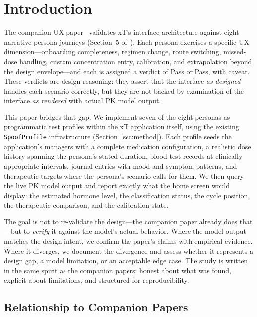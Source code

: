 \documentclass[11pt,a4paper]{article}
\newcommand{\good}[1]{\textcolor{ok}{#1}}
\newcommand{\code}[1]{\texttt{\small #1}}
\begin{document}
\tableofcontents
\clearpage

\section{Introduction}
\label{sec:intro}

The companion UX paper~\cite{xtux} validates xT's interface architecture
against eight narrative persona journeys (Section~5 of~\cite{xtux}). Each
persona exercises a specific UX dimension---onboarding completeness, regimen
change, route switching, missed-dose handling, custom concentration entry,
calibration, and extrapolation beyond the design envelope---and each is
assigned a verdict of \good{Pass} or \good{Pass, with caveat.} These
verdicts are design reasoning: they assert that the interface \emph{as
designed} handles each scenario correctly, but they are not backed by
examination of the interface \emph{as rendered} with actual PK model output.

This paper bridges that gap. We implement seven of the eight personas as
programmatic test profiles within the xT application itself, using the
existing \code{SpoofProfile} infrastructure (Section~\ref{sec:method}).
Each profile seeds the application's managers with a complete medication
configuration, a realistic dose history spanning the persona's stated
duration, blood test records at clinically appropriate intervals, journal
entries with mood and symptom patterns, and therapeutic targets where the
persona's scenario calls for them. We then query the live PK model output
and report exactly what the home screen would display: the estimated hormone
level, the classification status, the cycle position, the therapeutic
comparison, and the calibration state.

The goal is not to re-validate the design---the companion paper already does
that---but to \emph{verify} it against the model's actual behavior. Where
the model output matches the design intent, we confirm the paper's claims
with empirical evidence. Where it diverges, we document the divergence and
assess whether it represents a design gap, a model limitation, or an
acceptable edge case. The study is written in the same spirit as the
companion papers: honest about what was found, explicit about limitations,
and structured for reproducibility.

\subsection{Relationship to Companion Papers}
\end{document}
